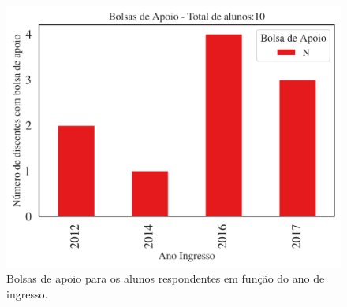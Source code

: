 \documentclass[a4paper,10pt]{article}
\begin{document}
\begin{figure}[h]
\centering
\includegraphics[width=0.99\linewidth]{quantitativos_bolsa_de_apoio_1132188}
\caption{\label{fig:bolsaano} Bolsas de apoio para os alunos respondentes em função do ano de ingresso.}
\end{figure}
\end{document}
